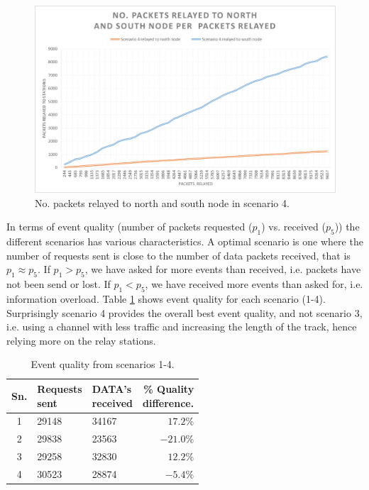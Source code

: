 \begin{figure}[H]
	\centering
	\includegraphics[width=1\linewidth]{results/NoPacketsRelayedScenario4}
	\caption{No. packets relayed to north and south node in scenario 4.}
	\label{fig:nopacketsrelayedscenario4}
\end{figure}

\noindent In terms of event quality (number of packets requested ($p_1$) vs. received ($p_5$)) the different scenarios has various characteristics. A optimal scenario is one where the number of requests sent is close to the number of data packets received, that is $p_1 \approx p_5$. If $p_1 > p_5$, we have asked for more events than received, i.e. packets have not been send or lost. If $p_1 < p_5$, we have received more events than asked for, i.e. information overload. Table \ref{table:eventquality} shows event quality for each scenario (1-4). Surprisingly scenario 4 provides the overall best event quality, and not scenario 3, i.e. using a channel with less traffic and increasing the length of the track, hence relying more on the relay stations.

\begin{table}[h]
	\centering
	\begin{tabular}{|c|l|l|r|} \hline
		Sn. & \pbox{4cm}{Requests \\ sent} & \pbox{18cm}{DATA's \\ received} & \pbox{18cm}{\% Quality \\ difference.} \\ \hline
		1 & 29148 & 34167 & $17.2\%$ \\ \hline
		2 & 29838 & 23563 & $-21.0\%$ \\ \hline
		3 & 29258 & 32830 & $12.2\%$ \\ \hline
		4 & 30523 & 28874 & $-5.4\%$ \\ \hline
	\end{tabular}
	\caption{Event quality from scenarios 1-4.}
	\label{table:eventquality}
\end{table}

